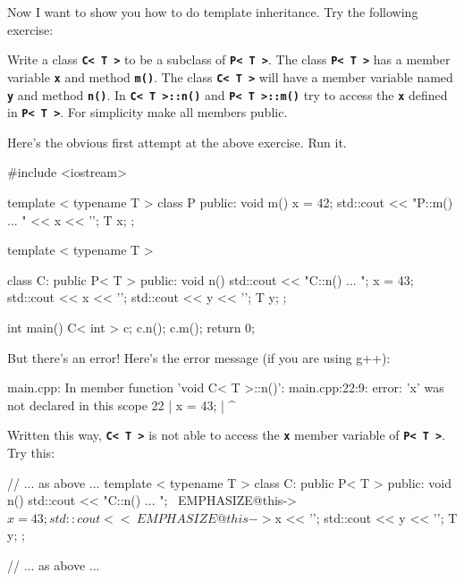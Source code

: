 Now I want to show you how to do template inheritance. Try the following
exercise:

\begin{ex}
Write a class \texttt{\textbf{C< T >}} to be a subclass of \texttt{\textbf{P< T >}}. The class \texttt{\textbf{P< T >}} has a member variable \texttt{\textbf{x}} and method \texttt{\textbf{m()}}. The class \texttt{\textbf{C< T >}}\textbf{ }will have a member variable named \texttt{\textbf{y}} and method \texttt{\textbf{n()}}. In \texttt{\textbf{C< T >::n()}} and \texttt{\textbf{P< T >::m()}} try to access the \texttt{\textbf{x}} defined in \texttt{\textbf{P< T >}}. For simplicity make all members public.
\end{ex}
Here's the obvious first attempt at the above exercise. Run it.
\begin{console}
#include <iostream>

template < typename T >
class P
{
public:
        void m()
        {
              x = 42;
              std::cout << "P::m() ... " << x << '\n';
        }
        T x;
};

template < typename T >

class C: public P< T >
{
public:
        void n()
        {
             std::cout << "C::n() ... \n";
             x = 43;
             std::cout << x << '\n';
             std::cout << y << '\n';
        }
        T y;
};

int main()
{   
    C< int > c;
    c.n();
    c.m();
    return 0;
}
\end{console}

But there's an error! Here's the error message (if you are using g++):
\begin{console}
main.cpp: In member function 'void C< T >::n()':
main.cpp:22:9: error: 'x' was not declared in this
scope
22 |         x = 43;
   |         ^ 
\end{console}

Written this way, \texttt{\textbf{C< T >}} is not able to access the \texttt{\textbf{x}} member variable of \texttt{\textbf{P< T >}}. Try this:
\begin{console}[commandchars=\~\@\$]
// ... as above ...
template < typename T >
class C: public P< T >
{
public:
        void n()
        {
             std::cout << "C::n() ... \n";
             ~EMPHASIZE@this->$x = 43;
             std::cout << ~EMPHASIZE@this->$x << '\n';
             std::cout << y << '\n';
        }
        T y;
};

// ... as above ...
\end{console}
